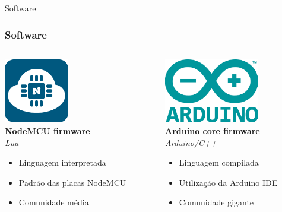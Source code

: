 \documentclass[10pt, compress]{beamer}
\begin{document}
\begin{frame}{Software}
  \frametitle{Software}
  \begin{columns}
        \begin{column}{0.48\textwidth}
          \begin{center}
            \includegraphics[width=80pt]{images/nodemcu.png}\\
            \textbf{NodeMCU firmware}\\
            \textit{Lua}\\
            \begin{itemize}
              \item Linguagem interpretada
              \item Padrão das placas NodeMCU
              \item Comunidade média
            \end{itemize}
          \end{center}


        \end{column}
        \begin{column}{0.48\textwidth}
          \begin{center}
            \includegraphics[height=80pt]{images/arduino.png}\\
            \textbf{Arduino core firmware}\\
            \textit{Arduino/C++}\\
            \begin{itemize}
              \item Linguagem compilada
              \item Utilização da Arduino IDE
              \item Comunidade gigante
            \end{itemize}
          \end{center}
        \end{column}
  \end{columns}

\end{frame}
\end{document}
